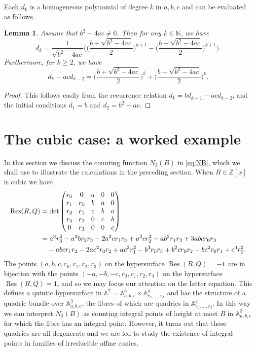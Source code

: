 \documentclass[11pt]{article}
\DeclareMathOperator{\Res}{Res}
\newcommand{\NN}{\mathbb{N}}
\newcommand{\ZZ}{\mathbb{Z}}\let\Z\ZZ
\newtheorem{lemma}[theorem]{Lemma}
\numberwithin{equation}{section}
\begin{document}
Each $d_k$ is a homogeneous polynomial of degree $k$ in $a,b,c$ and can be evaluated as follows.

\begin{lemma}\label{lem:res3}
Assume that $b^2-4ac\neq 0$.
Then for any $k\in \NN$, we have
\[
d_k=\frac{1}{\sqrt{b^2-4ac}}\biggl(\biggl(\frac{b+\sqrt{b^2-4ac}}{2}\biggr)^{k+1}-\biggl(\frac{b-\sqrt{b^2-4ac}}{2}\biggr)^{k+1}\biggr).
\]
Furthermore, for $k\geq 2$, we have
\[
d_k-acd_{k-2}=\biggl(\frac{b+\sqrt{b^2-4ac}}{2}\biggr)^{k}+\biggl(\frac{b-\sqrt{b^2-4ac}}{2}\biggr)^{k}.
\]
\end{lemma}
\begin{proof}
This follows easily from the recurrence relation $d_k=bd_{k-1}-acd_{k-2}$, and the initial conditions $d_{1}=b$ and $d_2=b^2-ac$.
\end{proof}

\section{The cubic case: a worked example}\label{s:3}

In this section we
discuss the counting function $N_3(B)$ in \eqref{eq:NB},
which we shall use to
illustrate the calculations in the preceding section.
When $R\in \ZZ[x]$ is cubic we have
\begin{align*}
\Res(R,Q)
&\arraycolsep4.5pt=
\det
\begin{pmatrix}
r_0 & 0 & a& 0& 0 \\
r_1 & r_0& b& a& 0 \\
r_2 & r_1& c& b& a \\
r_3 & r_2& 0& c& b \\
0 & r_3& 0& 0& c \\
\end{pmatrix}\\
&=a^3 r_3^2
-a^2 b r_2 r_3-2 a^2 c r_1 r_3 + a^2 c r_2^2+
a b^2 r_1 r_3 + 3 a b c r_0 r_3 \\
&\quad - a b c r_1 r_2 - 2 a c^2 r_0 r_2 +
a c^2 r_1^2
-b^3 r_0 r_3 + b^2 c r_0 r_2-b c^2 r_0 r_1 + c^3 r_0^2.
\end{align*}
The points $(a,b,c,r_0,r_1,r_2,r_3)$ on the hypersurface
$\Res(R,Q)=-1$ are in bijection with the
points $(-a,-b,-c,r_0,r_1,r_2,r_3)$ on the hypersurface
$\Res(R,Q)=1$, and so we may focus our attention on the latter equation.
This
defines a quintic hypersurface in $\mathbb{A}^7=\mathbb{A}_{a,b,c}^3\times \mathbb{A}_{r_0,\dots,r_3}^4$ and has the structure of a quadric bundle over $\mathbb{A}_{a,b,c}^3$, the fibres of which are quadrics in $\mathbb{A}_{r_0,\dots,r_3}^4$. In this way we can interpret $N_3(B)$ as counting integral points of height at most $B$ in $\mathbb{A}_{a,b,c}^3$ for which the fibre has
an integral point. However, it turns out that these quadrics are all degenerate and we are led to study
the existence of integral points in families of
irreducible affine conics.
\end{document}
